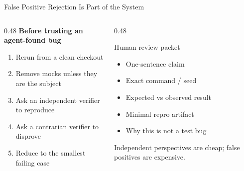\begin{frame}{False Positive Rejection Is Part of the System}
  \begin{columns}[T, onlytextwidth]
    \begin{column}{0.48\textwidth}
      \textbf{Before trusting an agent-found bug}\\[0.3em]
      \begin{enumerate}
        \item Rerun from a clean checkout
        \item Remove mocks unless they are the subject
        \item Ask an independent verifier to reproduce
        \item Ask a contrarian verifier to disprove
        \item Reduce to the smallest failing case
      \end{enumerate}
    \end{column}
    \hfill
    \begin{column}{0.48\textwidth}
      \begin{block}{Human review packet}
        \begin{itemize}
          \item One-sentence claim
          \item Exact command / seed
          \item Expected vs observed result
          \item Minimal repro artifact
          \item Why this is not a test bug
        \end{itemize}
      \end{block}
      \vspace{0.2em}
      \small Independent perspectives are cheap; false positives are expensive.
    \end{column}
  \end{columns}
\end{frame}

